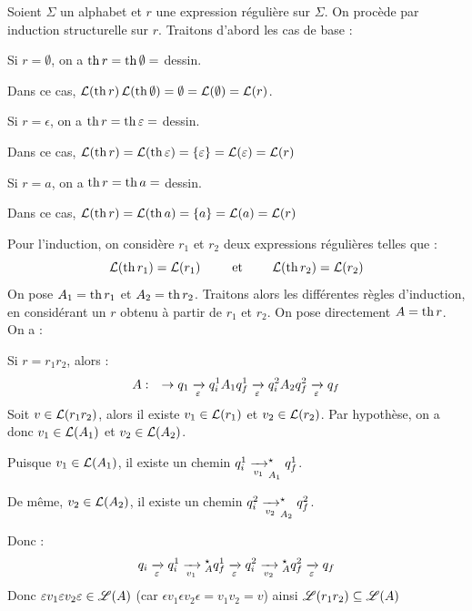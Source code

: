     \begin{nproof}
        Soient $\Sigma$ un alphabet et $r$ une expression régulière sur $\Sigma$. On procède par induction structurelle sur $r$. Traitons d'abord les cas de base :
        \begin{enumerate}
            \itt Si $r = \emptyset$, on a $\th r = \th \emptyset = $ dessin.
            
            Dans ce cas, $\bcL\p{\th r}\bcL\p{\th \emptyset} = \emptyset = \bcL\p{\emptyset} = \bcL\p{r}$.
            
            \itt Si $r = \epsilon$, on a $\th r = \th \epsilon = $ dessin.
            
            Dans ce cas, $\bcL\p{\th r} = \bcL \p{\th \epsilon} = \ens{\epsilon} = \bcL\p{\epsilon} = \bcL\p{r}$
            
            \itt Si $r = a$, on a $\th r = \th a = $ dessin.
            
            Dans ce cas, $\bcL\p{\th r} = \bcL \p{\th a} = \ens{a} = \bcL\p{a} = \bcL\p{r}$
        \end{enumerate}
        Pour l'induction, on considère $r_1$ et $r_2$ deux expressions régulières telles que :
        \[ \bcL\p{\th r_1} = \bcL\p{r_1} \qquad\et\qquad \bcL\p{\th r_2} = \bcL\p{r_2} \]
        On pose $A_1 = \th r_1$ et $A_2 = \th r_2$. Traitons alors les différentes règles d'induction, en considérant un $r$ obtenu à partir de $r_1$ et $r_2$. On pose directement $A = \th r$. On a :
        \begin{enumerate}
            \itt Si $r = r_1r_2$, alors :
            \[ A :\quad \to q_1 \lima{\epsilon} q_i^1 A_1 q_f^1 \lima{\epsilon} q_i^2 A_2 q_f^2 \lima{\epsilon} q_f\]
            Soit $v \in \mathcal{L}\!\left(r_1r_2\right)$, alors il existe $v_1 \in \mathcal{L}\!\left(r_1\right)$ et $v_2 \in \mathcal{L}\!\left(r_2\right)$. Par hypothèse, on a donc $v_1 \in \mathcal{L}\!\left(A_1\right)$ et $v_2 \in \mathcal{L}\!\left(A_2\right)$.
            
            Puisque $v_1 \in \mathcal{L}\!\left(A_1\right)$, il existe un chemin $q_i^1 \lima{v_1}_{A_1}^\star q_f^1$.
            
            De même, $v_2 \in \mathcal{L}\!\left(A_2\right)$, il existe un chemin $q_i^2 \lima{v_2}_{A_2}^\star q_f^2$.
            
            Donc :
            \[ q_i \lima{\epsilon} q_i^1 \lima{v_1}{}_A^\star q_f^1 \lima{\epsilon}  q_i^2 \lima{v_2}{}_A^\star q_f^2 \lima{\epsilon}  q_f\]
            Donc $\varepsilon v_1 \varepsilon v_2 \varepsilon \in \mathscr{L} \!\left(A\right)$
        (car $\epsilon v_1 \epsilon v_2 \epsilon = v_1 v_2 = v$)
        ainsi $\mathscr{L}\!\left(r_1r_2\right) \subseteq \mathscr{L}(A)$ 
            

\end{enumerate}
\end{nproof}
